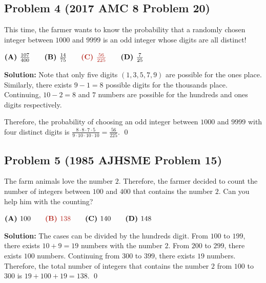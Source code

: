 \documentclass{article}
\newenvironment{solution}
    {\begin{trivlist}\item[]{\bf Solution:}}
    {\qed \end{trivlist}}
\begin{document}
\subsection*{
\textcolor{BrickRed}{Problem 4
\footnotesize (2017 AMC 8 Problem 20)}}
{\color {Gray}
This time, the farmer wants to know the probability
that a randomly chosen integer between $1000$ and $9999$
is an odd integer whose digits are all distinct!

$
\textbf{(A) } \frac{107}{400} \qquad
\textbf{(B) } \frac{14}{75}   \qquad
\textcolor{BrickRed}{\textbf{(C) } \frac{56}{225}} \qquad
\textbf{(D) } \frac{7}{25}
$
}

\begin{solution}
Note that only five digits $(1, 3, 5, 7, 9)$ are
possible for the ones place. Similarly, there exists
$9 - 1 = 8$ possible digits for the thousands place.
Continuing, $10 - 2 = 8$ and $7$ numbers are possible
for the hundreds and ones digits respectively.

Therefore, the probability of choosing an odd integer
between $1000$ and $9999$ with four distinct digits
is $\frac{8 \cdot 8 \cdot 7 \cdot 5}{9 \cdot 10
\cdot 10 \cdot 10} = \frac{56}{225}$.
\end{solution}


\subsection*{
\textcolor{BrickRed}{Problem 5
\footnotesize (1985 AJHSME Problem 15)}}
{\color {Gray}
The farm animals love the number $2$. Therefore, the
farmer decided to count the number of integers between
$100$ and $400$ that contains the number $2$. Can you
help him with the counting?

$
\textbf{(A) } 100 \qquad
\textcolor{BrickRed}{\textbf{(B) } 138} \qquad
\textbf{(C) } 140 \qquad
\textbf{(D) } 148
$
}

\begin{solution}
The cases can be divided by the hundreds digit.
From $100$ to $199$, there exists $10 + 9 = 19$
numbers with the number $2$. From $200$ to $299$,
there exists $100$ numbers. Continuing from $300$
to $399$, there exists $19$ numbers. Therefore,
the total number of integers that contains the
number $2$ from $100$ to $300$ is $19 + 100 + 19
= 138$.
\end{solution}
\end{document}
